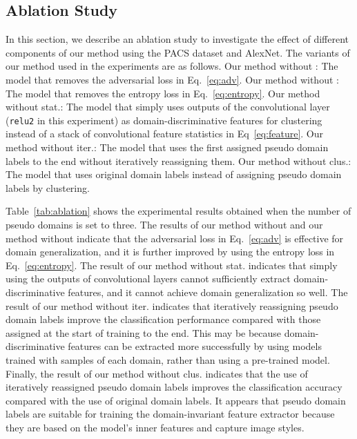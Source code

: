 \documentclass[letterpaper]{article} \usepackage{aaai20}  \usepackage{times}  \usepackage{helvet} \usepackage{courier}  \usepackage[hyphens]{url}  \usepackage{graphicx} \urlstyle{rm} \def\UrlFont{\rm}  \usepackage{graphicx}  \usepackage[whole]{bxcjkjatype}
\begin{document}
\subsection{Ablation Study}
In this section, we describe an ablation study to investigate the effect of different components of our method using the PACS dataset and AlexNet.
The variants of our method used in the experiments are as follows. Our method without : The model that removes the adversarial loss in Eq.~\ref{eq:adv}. Our method without : The model that removes the entropy loss in Eq.~\ref{eq:entropy}. Our method without stat.: The model that simply uses outputs of the convolutional layer (\texttt{relu2} in this experiment) as domain-discriminative features for clustering instead of a stack of convolutional feature statistics in Eq~\ref{eq:feature}. Our method without iter.: The model that uses the first assigned pseudo domain labels to the end without iteratively reassigning them. Our method without clus.: The model that uses original domain labels instead of assigning pseudo domain labels by clustering.\par 
Table~\ref{tab:ablation} shows the experimental results obtained when the number of pseudo domains is set to three. The results of our method without  and our method without  indicate that the adversarial loss in Eq.~\ref{eq:adv} is effective for domain generalization, and it is further improved by using the entropy loss in Eq.~\ref{eq:entropy}. The result of our method without stat. indicates that simply using the outputs of convolutional layers cannot sufficiently extract domain-discriminative features, and it cannot achieve domain generalization so well.
The result of our method without iter. indicates that iteratively reassigning pseudo domain labels improve the classification performance compared with those assigned at the start of training to the end. This may be because domain-discriminative features can be extracted more successfully by using models trained with samples of each domain, rather than using a pre-trained model.
Finally, the result of our method without clus. indicates that the use of iteratively reassigned pseudo domain labels improves the classification accuracy compared with the use of original domain labels. It appears that pseudo domain labels are suitable for training the domain-invariant feature extractor because they are based on the model's inner features and capture image styles.
\end{document}
